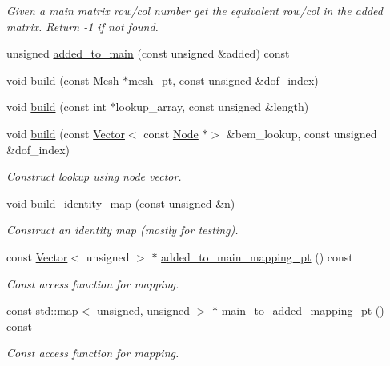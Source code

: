 \begin{DoxyCompactItemize}
\begin{DoxyCompactList}\small\item\em Given a main matrix row/col number get the equivalent row/col in the added matrix. Return -\/1 if not found. \end{DoxyCompactList}\item 
unsigned \hyperlink{classoomph_1_1AddedMainNumberingLookup_a65297d7f82675ef555e59a98875ead4d}{added\+\_\+to\+\_\+main} (const unsigned \&added) const
\item 
void \hyperlink{classoomph_1_1AddedMainNumberingLookup_a8b0c78b4c7048915b3912af0b87f5a76}{build} (const \hyperlink{classoomph_1_1Mesh}{Mesh} $\ast$mesh\+\_\+pt, const unsigned \&dof\+\_\+index)
\item 
void \hyperlink{classoomph_1_1AddedMainNumberingLookup_aea76ee043104c63f3ecbd641f98ae10d}{build} (const int $\ast$lookup\+\_\+array, const unsigned \&length)
\item 
void \hyperlink{classoomph_1_1AddedMainNumberingLookup_a98201561fb51621a105d4100ea92ee53}{build} (const \hyperlink{classoomph_1_1Vector}{Vector}$<$ const \hyperlink{classoomph_1_1Node}{Node} $\ast$$>$ \&bem\+\_\+lookup, const unsigned \&dof\+\_\+index)
\begin{DoxyCompactList}\small\item\em Construct lookup using node vector. \end{DoxyCompactList}\item 
void \hyperlink{classoomph_1_1AddedMainNumberingLookup_a9c7ba1fc62b5943637f8e9f813a24e99}{build\+\_\+identity\+\_\+map} (const unsigned \&n)
\begin{DoxyCompactList}\small\item\em Construct an identity map (mostly for testing). \end{DoxyCompactList}\item 
const \hyperlink{classoomph_1_1Vector}{Vector}$<$ unsigned $>$ $\ast$ \hyperlink{classoomph_1_1AddedMainNumberingLookup_a28e014d37c7dffa2365cb187464e02d7}{added\+\_\+to\+\_\+main\+\_\+mapping\+\_\+pt} () const
\begin{DoxyCompactList}\small\item\em Const access function for mapping. \end{DoxyCompactList}\item 
const std\+::map$<$ unsigned, unsigned $>$ $\ast$ \hyperlink{classoomph_1_1AddedMainNumberingLookup_aa9cd986afc15cd147266fce053d5cded}{main\+\_\+to\+\_\+added\+\_\+mapping\+\_\+pt} () const
\begin{DoxyCompactList}\small\item\em Const access function for mapping. \end{DoxyCompactList}\end{DoxyCompactItemize}
